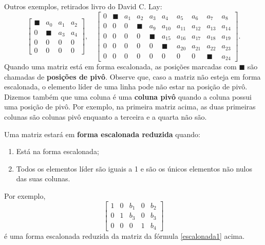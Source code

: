 \documentclass[../livro.tex]{subfiles} %
\begin{document}
Outros exemplos, retirados livro do David C. Lay:
\begin{equation}
\left[
\begin{array}{cccc}
\blacksquare & a_0 & a_1 & a_2 \\
0 & \blacksquare & a_3 & a_4 \\
0 & 0 & 0 & 0 \\
0 & 0 & 0 & 0
\end{array}
\right], \quad
\left[
\begin{array}{cccccccccc}
0 & \blacksquare & a_1 & a_2 & a_3 & a_4 & a_5 & a_6 & a_7 & a_8\\
0 & 0 & 0 & \blacksquare & a_9 & a_{10} & a_{11} & a_{12} & a_{13} & a_{14}\\
0 & 0 & 0 & 0 & \blacksquare & a_{15} & a_{16} & a_{17} & a_{18} & a_{19}\\
0 & 0 & 0 & 0 & 0 & \blacksquare & a_{20} & a_{21} & a_{22} & a_{23} \\
0 & 0 & 0 & 0 & 0 & 0 & 0 & 0 & \blacksquare & a_{24}
\end{array}
\right].
\end{equation} Quando uma matriz está em forma escalonada, as posições marcadas com $\blacksquare$ são chamadas de \textbf{posições de pivô}. Observe que, caso a matriz não esteja em forma escalonada, o elemento líder de uma linha pode não estar na posição de pivô. Dizemos também que uma coluna é uma \textbf{coluna pivô} quando a coluna possui uma posição de pivô. Por exemplo, na primeira matriz acima, as duas primeiras colunas são colunas pivô enquanto a terceira e a quarta não são.

\vspace{0.2cm}

Uma matriz estará em \textbf{forma escalonada reduzida} quando:
\begin{enumerate}
  \item Está na forma escalonada;
  \item Todos os elementos líder são iguais a 1 e são os únicos elementos não nulos das suas colunas.
\end{enumerate} Por exemplo,
\begin{equation}
\left[
\begin{array}{ccccc}
   1 & 0 & b_{1} & 0 & b_{2}\\
   0 & 1 & b_{3} & 0 & b_{3}\\
   0 & 0 & 0 & 1 & b_{4}
\end{array}
\right]
\end{equation} é uma forma escalonada reduzida da matriz da fórmula \eqref{escalonada1} acima.
\end{document}
